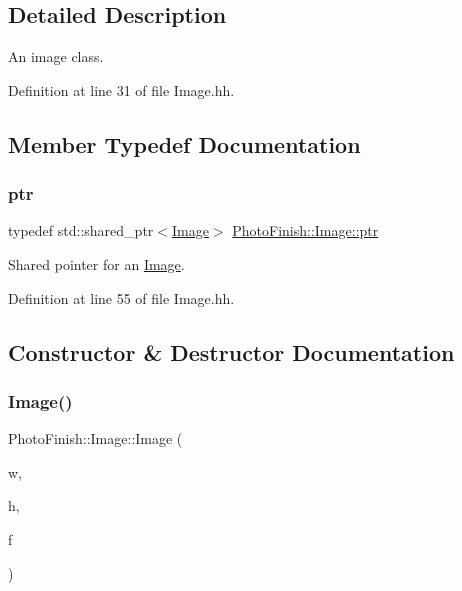 \subsection{Detailed Description}
An image class. 

Definition at line 31 of file Image.\+hh.



\subsection{Member Typedef Documentation}
\mbox{\label{class_photo_finish_1_1_image_ab336203305ed3a1397d7245063353b5a}} 
\subsubsection{\texorpdfstring{ptr}{ptr}}
{\footnotesize\ttfamily typedef std\+::shared\+\_\+ptr$<$\hyperlink{class_photo_finish_1_1_image}{Image}$>$ \hyperlink{class_photo_finish_1_1_image_ab336203305ed3a1397d7245063353b5a}{Photo\+Finish\+::\+Image\+::ptr}}



Shared pointer for an \hyperlink{class_photo_finish_1_1_image}{Image}. 



Definition at line 55 of file Image.\+hh.



\subsection{Constructor \& Destructor Documentation}
\mbox{\label{class_photo_finish_1_1_image_abffc53a4457723380ba48f27f2412452}} 
\subsubsection{\texorpdfstring{Image()}{Image()}}
{\footnotesize\ttfamily Photo\+Finish\+::\+Image\+::\+Image (\begin{DoxyParamCaption}\item[{unsigned int}]{w,  }\item[{unsigned int}]{h,  }\item[{\hyperlink{class_c_m_s_1_1_format}{C\+M\+S\+::\+Format}}]{f }\end{DoxyParamCaption})}



